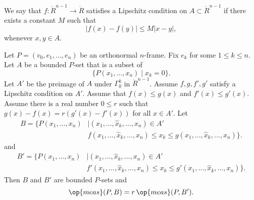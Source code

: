 \begin{definition}  We say that $f:\ring{R}^{n-1} \to \ring{R}$
satisfies a Lipschitz condition on $A\subset \ring{R}^{n-1}$ if
there exists a constant $M$ such that
    $$|f(x) - f(y)|\le M |x - y|,$$
whenever $x,y\in A$.
\end{definition}

\begin{lemma}
Let $P = (v_0,e_1,\ldots,e_n)$ be an orthonormal $n$-frame. Fix
$e_k$ for some $1\le k\le n$.  Let $A$ be a bounded $P$-set that is
a subset of
    $$\{P(x_1,\ldots,x_n) \mid x_k = 0\}.$$
Let $A'$ be the preimage of $A$ under $\Gamma^k_0$ in
$\ring{R}^{n-1}$.   Assume $f,g,f',g'$ satisfy a Lipschitz condition
on $A'$. Assume that $f(x)\le g(x)$ and $f'(x)\le g'(x)$.  Assume
there is a real number $0\le r$ such that $g(x)-f(x) = r(g'(x) -
f'(x))$ for all $x\in A'$. Let
    $$\begin{array}{lll}
    B=\{P(x_1,\ldots,x_n) &\mid (x_1,\ldots,\hat x_k,\ldots,x_n) \in
    A'\\
    &f(x_1,\ldots,\hat x_k,\ldots,x_n) \le x_k \le
    g(x_1,\ldots,\hat x_k,\ldots,x_n)\}.
    \end{array}
    $$
and
    $$\begin{array}{lll}
    B'=\{P(x_1,\ldots,x_n) &\mid (x_1,\ldots,\hat x_k,\ldots,x_n) \in
    A'\\
    &f'(x_1,\ldots,\hat x_k,\ldots,x_n) \le x_k \le
    g'(x_1,\ldots,\hat x_k,\ldots,x_n)\}.
    \end{array}
    $$
Then $B$ and $B'$ are bounded $P$-sets and
    $$\op{meas}(P,B) = r\,\op{meas}(P,B').$$
\end{lemma}

